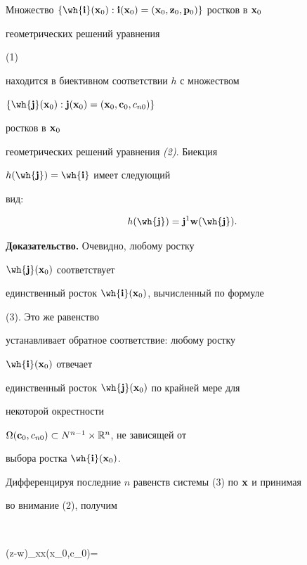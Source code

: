 \begin{lem}


Множество $\{\wh{\bold i}(\bold x_0):\bold i(\bold x_0)=


(\bold x_0,\bold z_0,\bold p_0)\}$ ростков в $\bold x_0$


геометрических решений уравнения {\em


(1)} находится в биективном соответствии $h$ с множеством 


$\{\wh{\bold j}(\bold x_0):\bold j(\bold x_0)=


(\bold x_0,\bold c_0,c_{n0})\}$


ростков в $\bold x_0$


геометрических решений уравнения {\em (2)}. Биекция


$h(\wh{\bold j})=\wh{\bold i}$ имеет следующий


вид:


\begin{equation}


h(\wh{\bold j})=\bold j^1\bold w(\wh{\bold j}).


\end{equation}


\end{lem}





{\bf Доказательство.} Очевидно, любому ростку


$\wh{\bold j}(\bold x_0)$ соответствует


единственный росток $\wh{\bold i}(\bold x_0)$, вычисленный по формуле


(3). Это же равенство


устанавливает обратное соответствие: любому ростку


$\wh{\bold i}(\bold x_0)$ отвечает


единственный росток $\wh{\bold j}(\bold x_0)$ по крайней мере для


некоторой окрестности


$\Omega(\bold c_0,c_{n0})\subset N^{n-1}\times\Bbb R^n$, не зависящей от


выбора ростка $\wh{\bold i}(\bold x_0)$.





Дифференцируя последние $n$ равенств системы (3) по $\bold x$ и принимая


во внимание (2), получим


$$


(z-\bold w)_{\bold x\bold x}(\bold x_0,\bold c_0)=


